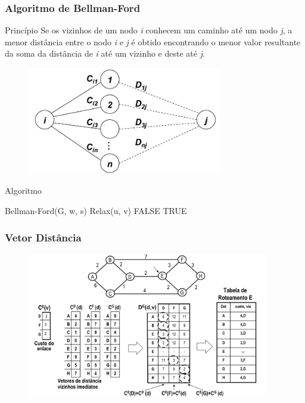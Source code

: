 \documentclass{beamer}
\begin{document}
\begin{frame}
\frametitle{Algoritmo de Bellman-Ford}
\begin{block}{Princípio}
Se os vizinhos de um nodo \emph{i} conhecem um caminho até um nodo \emph{j}, a menor distância
entre o nodo \emph{i} e \emph{j} é obtido encontrando o menor valor resultante
da soma da distância de \emph{i} até um vizinho e deste até \emph{j}.
\end{block}
\begin{figure}[htp]
\begin{center}
  \includegraphics[width=85mm]{Imagens/BellmanFord.jpeg}
  \label{bellman_ford}
\end{center}
\end{figure}
\end{frame}

\begin{frame}
\begin{block}{Algoritmo}
\begin{algorithmic}
    \STATE Bellman-Ford(G, w, s)
    		\STATE Relax(u, v)
    	\ENDFOR
    \ENDFOR 
    		\RETURN FALSE
    	\ENDIF
   	\ENDFOR
   	\RETURN TRUE
\end{algorithmic}
\end{block}
\end{frame}

\begin{frame}
\frametitle{Vetor Distância}
\begin{figure}[htp]
\begin{center}
  \includegraphics[width=105mm]{Imagens/VetorDistancia.png}
  \label{vetor_distancia}
\end{center}
\end{figure}
\end{frame}
\end{document}
